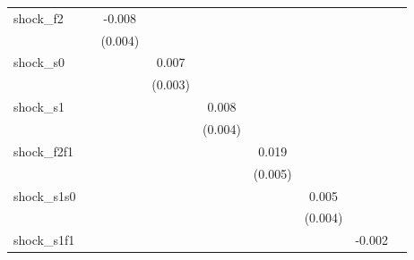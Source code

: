 {\begin{tabular}{l*{8}{c}}
\addlinespace
shock\_f2    &                     &      -0.008\sym{*}  &                     &                     &                     &                     &                     &                     \\
            &                     &     (0.004)         &                     &                     &                     &                     &                     &                     \\
\addlinespace
shock\_s0    &                     &                     &       0.007\sym{*}  &                     &                     &                     &                     &                     \\
            &                     &                     &     (0.003)         &                     &                     &                     &                     &                     \\
\addlinespace
shock\_s1    &                     &                     &                     &       0.008\sym{**} &                     &                     &                     &                     \\
            &                     &                     &                     &     (0.004)         &                     &                     &                     &                     \\
\addlinespace
shock\_f2f1  &                     &                     &                     &                     &       0.019\sym{***}&                     &                     &                     \\
            &                     &                     &                     &                     &     (0.005)         &                     &                     &                     \\
\addlinespace
shock\_s1s0  &                     &                     &                     &                     &                     &       0.005         &                     &                     \\
            &                     &                     &                     &                     &                     &     (0.004)         &                     &                     \\
\addlinespace
shock\_s1f1  &                     &                     &                     &                     &                     &                     &      -0.002         &                     \\

\end{tabular}}
